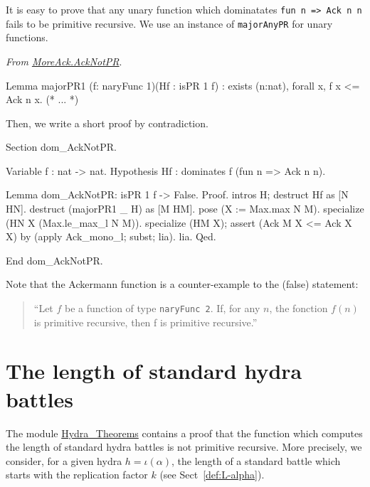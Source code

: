 \begin{remark}
It is easy to prove that any unary function which dominatates \texttt{fun n => Ack n n} fails to be primitive recursive. We use an instance of \texttt{majorAnyPR} for unary functions.

\vspace{4pt}
\noindent

\emph{From \href{../theories/html/hydras.MoreAck.AckNotPR.html}{MoreAck.AckNotPR}}.
\begin{Coqsrc}
Lemma majorPR1  (f: naryFunc 1)(Hf : isPR 1 f)
  : exists (n:nat), forall x, f x <= Ack n x.
(* ... *)
\end{Coqsrc}

Then, we write  a short proof by contradiction.

\begin{Coqsrc}
Section dom_AckNotPR.

  Variable f : nat -> nat.
  Hypothesis Hf : dominates f (fun n => Ack n n).

 Lemma dom_AckNotPR: isPR 1 f -> False.
  Proof.
    intros H;  destruct Hf as [N HN].
    destruct  (majorPR1 _ H) as [M HM].
    pose (X := Max.max N M).
    specialize (HN X  (Max.le_max_l N M)).
    specialize (HM X);
      assert (Ack M X <= Ack X X) by (apply Ack_mono_l; subst; lia).
    lia.
  Qed.

End dom_AckNotPR.
\end{Coqsrc}
\end{remark}

\begin{remark}
Note that the Ackermann function is a counter-example to the (false) statement:
\begin{quote}
{\color{red}
  ``Let $f$ be a function of type \texttt{naryFunc\,2}. If, for any $n$, the fonction $f(n)$ is primitive recursive, then f is primitive recursive.''}
\end{quote}
\end{remark}


\section{The length of standard hydra battles}
\label{sect:battle-length-notPR}

The module \href{../theories/html/hydras.Hydra.Hydra_Theorems.html}{Hydra\_Theorems} contains a proof that the function which computes the length of standard hydra battles is not primitive recursive. More precisely, we consider, for a given hydra $h=\iota(\alpha)$, the length of a standard battle which starts with the replication factor $k$ (see Sect~\vref{def:L-alpha}).

